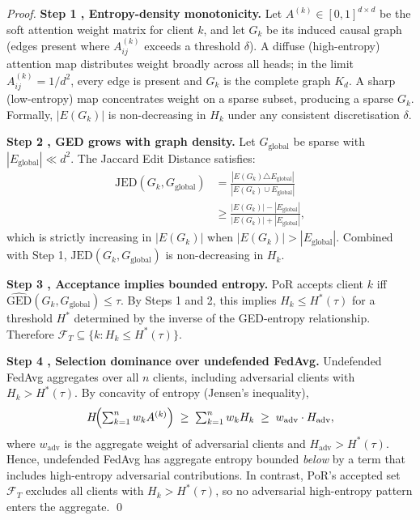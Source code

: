 \documentclass[journal]{IEEEtran}
\begin{document}
\begin{proof}
\textbf{Step 1 ,  Entropy-density monotonicity.}
Let $A^{(k)} \in [0,1]^{d \times d}$ be the soft attention weight matrix for client $k$, and let $G_k$ be its induced causal graph (edges present where $A^{(k)}_{ij}$ exceeds a threshold $\delta$). A diffuse (high-entropy) attention map distributes weight broadly across all heads; in the limit $A^{(k)}_{ij} = 1/d^2$, every edge is present and $G_k$ is the complete graph $K_d$. A sharp (low-entropy) map concentrates weight on a sparse subset, producing a sparse $G_k$. Formally, $|E(G_k)|$ is non-decreasing in $H_k$ under any consistent discretisation $\delta$.

\textbf{Step 2 ,  GED grows with graph density.}
Let $G_\text{global}$ be sparse with $|E_\text{global}| \ll d^2$. The Jaccard Edit Distance satisfies:
\[
\begin{split}
\text{JED}(G_k, G_\text{global})
&= \frac{|E(G_k) \triangle E_\text{global}|}
 {|E(G_k) \cup E_\text{global}|} \\[4pt]
&\ge \frac{|E(G_k)| - |E_\text{global}|}
 {|E(G_k)| + |E_\text{global}|},
\end{split}
\]
which is strictly increasing in $|E(G_k)|$ when $|E(G_k)| > |E_\text{global}|$. Combined with Step 1, $\text{JED}(G_k, G_\text{global})$ is non-decreasing in $H_k$.

\textbf{Step 3 , Acceptance implies bounded entropy.}
PoR accepts client $k$ iff $\widehat{\text{GED}}(G_k, G_\text{global}) \le \tau$. By Steps 1 and 2, this implies $H_k \le H^*(\tau)$ for a threshold $H^*$ determined by the inverse of the GED-entropy relationship. Therefore $\mathcal{F}_T \subseteq \{k : H_k \le H^*(\tau)\}$.

\textbf{Step 4 , Selection dominance over undefended FedAvg.}
Undefended FedAvg aggregates over all $n$ clients, including adversarial clients with $H_k > H^*(\tau)$. By concavity of entropy (Jensen's inequality),
\[
H\!\Bigl(\textstyle\sum_{k=1}^{n} w_k A^{(k)}\Bigr)
\;\ge\; \sum_{k=1}^{n} w_k H_k
\;\ge\; w_\text{adv} \cdot H_\text{adv},
\]
where $w_\text{adv}$ is the aggregate weight of adversarial clients and $H_\text{adv} > H^*(\tau)$. Hence, undefended FedAvg has aggregate entropy bounded \emph{below} by a term that includes high-entropy adversarial contributions. In contrast, PoR's accepted set $\mathcal{F}_T$ excludes all clients with $H_k > H^*(\tau)$, so no adversarial high-entropy pattern enters the aggregate. \qed
\end{proof}
\end{document}
